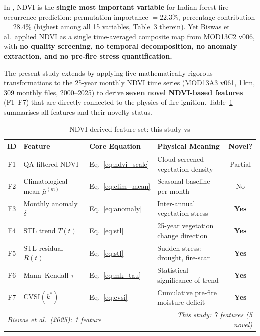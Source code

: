 \documentclass[12pt, a4paper]{article}
\begin{document}
\begin{gapbox}
In \citet{biswas2025}, NDVI is the \textbf{single most important variable}
for Indian forest fire occurrence prediction:
permutation importance $= 22.3\%$, percentage contribution $= 28.4\%$
(highest among all 15 variables, Table~3 therein).
Yet Biswas et al.\ applied NDVI as a single time-averaged composite map
from MOD13C2 v006, with \textbf{no quality screening, no temporal
decomposition, no anomaly extraction, and no pre-fire stress
quantification.}
\end{gapbox}

The present study extends \citet{biswas2025} by applying five
mathematically rigorous transformations to the 25-year monthly NDVI
time series (MOD13A3 v061, 1\,km, 309 monthly files, 2000--2025) to
derive \textbf{seven novel NDVI-based features} (F1--F7) that are
directly connected to the physics of fire ignition.
Table~\ref{tab:features_overview} summarises all features and their
novelty status.

\begin{table}[H]
\centering
\caption{NDVI-derived feature set: this study vs \citet{biswas2025}}
\label{tab:features_overview}
\small
\begin{tabular}{@{}clllc@{}}
\toprule
\textbf{ID} & \textbf{Feature} & \textbf{Core Equation} &
\textbf{Physical Meaning} & \textbf{Novel?} \\
\midrule
F1 & QA-filtered NDVI & Eq.~\eqref{eq:ndvi_scale} &
    Cloud-screened vegetation density & Partial \\
F2 & Climatological mean $\bar{\mu}^{(m)}$ & Eq.~\eqref{eq:clim_mean} &
    Seasonal baseline per month & No \\
\rowcolor{lightgreen}
F3 & Monthly anomaly $\delta$ & Eq.~\eqref{eq:anomaly} &
    Inter-annual vegetation stress & \textbf{Yes} \\
\rowcolor{lightgreen}
F4 & STL trend $T(t)$ & Eq.~\eqref{eq:stl} &
    25-year vegetation change direction & \textbf{Yes} \\
\rowcolor{lightgreen}
F5 & STL residual $R(t)$ & Eq.~\eqref{eq:stl} &
    Sudden stress: drought, fire-scar & \textbf{Yes} \\
\rowcolor{lightgreen}
F6 & Mann--Kendall $\tau$ & Eq.~\eqref{eq:mk_tau} &
    Statistical significance of trend & \textbf{Yes} \\
\rowcolor{lightgreen}
F7 & CVSI$(k^{*})$ & Eq.~\eqref{eq:cvsi} &
    Cumulative pre-fire moisture deficit & \textbf{Yes} \\
\midrule
\multicolumn{3}{l}{\textit{Biswas et al.\ (2025): 1 feature}} &
\multicolumn{2}{r}{\textit{This study: 7 features (5 novel)}} \\
\bottomrule
\end{tabular}
\end{table}
\end{document}
